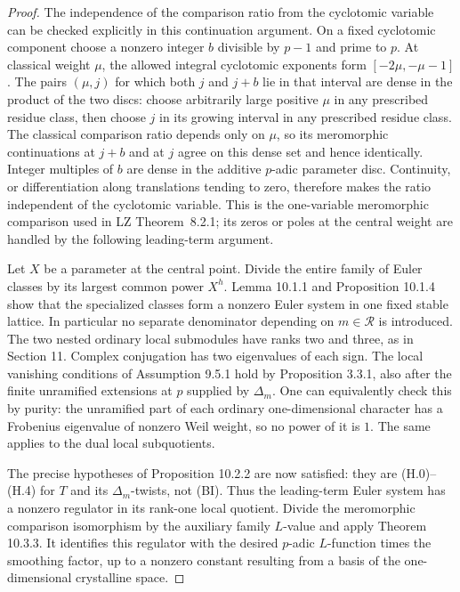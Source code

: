 \begin{proof}
The independence of the comparison ratio from the cyclotomic variable
can be checked explicitly in this continuation argument. On a fixed
cyclotomic component choose a nonzero integer $b$ divisible by $p-1$
and prime to $p$. At classical weight $\mu$, the allowed integral
cyclotomic exponents form $[-2\mu,-\mu-1]$. The pairs $(\mu,j)$ for
which both $j$ and $j+b$ lie in that interval are dense in the product
of the two discs: choose arbitrarily large positive $\mu$ in any
prescribed residue class, then choose $j$ in its growing interval in
any prescribed residue class. The classical comparison ratio depends
only on $\mu$, so its meromorphic continuations at $j+b$ and at $j$
agree on this dense set and hence identically. Integer multiples of
$b$ are dense in the additive $p$-adic parameter disc. Continuity,
or differentiation along translations tending to zero, therefore
makes the ratio independent of the cyclotomic variable. This is the
one-variable meromorphic comparison used in LZ Theorem~8.2.1; its
zeros or poles at the central weight are handled by the following
leading-term argument.

Let $X$ be a parameter at the central point.  Divide the entire family
of Euler classes by its largest common power $X^h$.  Lemma 10.1.1 and
Proposition 10.1.4 show that the specialized classes form a nonzero
Euler system in one fixed stable lattice.  In particular no separate
denominator depending on $m\in\mathcal R$ is introduced.  The two nested
ordinary local submodules have ranks two and three, as in Section 11.
Complex conjugation has two eigenvalues of each sign.  The local
vanishing conditions of Assumption 9.5.1 hold by Proposition 3.3.1,
also after the finite unramified extensions at $p$ supplied by $\Delta_m$.
One can equivalently check this by purity: the unramified part of each
ordinary one-dimensional character has a Frobenius eigenvalue of
nonzero Weil weight, so no power of it is $1$.  The same applies to
the dual local subquotients.

The precise hypotheses of Proposition 10.2.2 are now satisfied: they
are (H.0)--(H.4) for $T$ and its $\Delta_m$-twists, not (BI).  Thus the
leading-term Euler system has a nonzero regulator in its rank-one
local quotient.  Divide the meromorphic comparison isomorphism by
the auxiliary family $L$-value and apply Theorem 10.3.3.  It identifies
this regulator with the desired $p$-adic $L$-function times the
smoothing factor, up to a nonzero constant resulting from a basis of
the one-dimensional crystalline space.


\end{proof}

